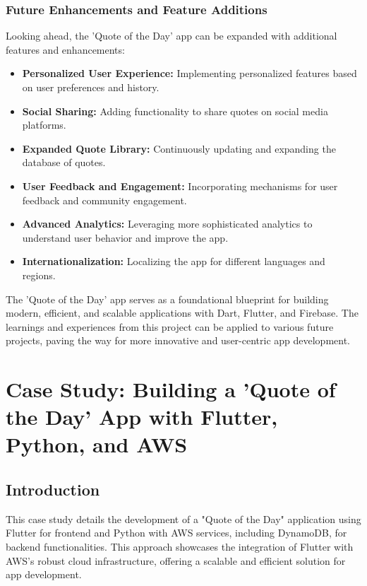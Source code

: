 \documentclass{book}
\begin{document}
\subsection{Future Enhancements and Feature Additions}
Looking ahead, the 'Quote of the Day' app can be expanded with additional features and enhancements:
\begin{itemize}
    \item \textbf{Personalized User Experience:} Implementing personalized features based on user preferences and history.
    \item \textbf{Social Sharing:} Adding functionality to share quotes on social media platforms.
    \item \textbf{Expanded Quote Library:} Continuously updating and expanding the database of quotes.
    \item \textbf{User Feedback and Engagement:} Incorporating mechanisms for user feedback and community engagement.
    \item \textbf{Advanced Analytics:} Leveraging more sophisticated analytics to understand user behavior and improve the app.
    \item \textbf{Internationalization:} Localizing the app for different languages and regions.
\end{itemize}

The 'Quote of the Day' app serves as a foundational blueprint for building modern, efficient, and scalable applications with Dart, Flutter, and Firebase. The learnings and experiences from this project can be applied to various future projects, paving the way for more innovative and user-centric app development.



\chapter{Case Study: Building a 'Quote of the Day' App with Flutter, Python, and AWS}

\section{Introduction}
This case study details the development of a "Quote of the Day" application using Flutter for frontend and Python with AWS services, including DynamoDB, for backend functionalities. This approach showcases the integration of Flutter with AWS's robust cloud infrastructure, offering a scalable and efficient solution for app development.
\end{document}
